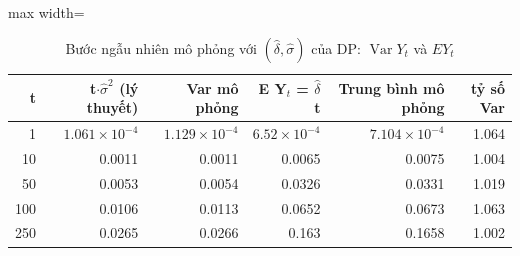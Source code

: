 \begin{table}[H]
\centering\small
\caption{Bước ngẫu nhiên mô phỏng với $(\hat\delta,\hat\sigma)$ của DP: $\operatorname{Var}Y_t$ và $EY_t$}\label{tab:tab_b12_02_rw_variance}
\begin{adjustbox}{max width=\linewidth}
\begin{tabular}{rrrrrr}
\toprule
t & t$\cdot\hat{\sigma}^{2}$ (lý thuyết) & Var mô phỏng & E Y$_{t}$ = $\hat{\delta}$t & Trung bình mô phỏng & tỷ số Var \\
\midrule
1 & $1.061\times10^{-4}$ & $1.129\times10^{-4}$ & $6.52\times10^{-4}$ & $7.104\times10^{-4}$ & 1.064 \\
10 & 0.0011 & 0.0011 & 0.0065 & 0.0075 & 1.004 \\
50 & 0.0053 & 0.0054 & 0.0326 & 0.0331 & 1.019 \\
100 & 0.0106 & 0.0113 & 0.0652 & 0.0673 & 1.063 \\
250 & 0.0265 & 0.0266 & 0.163 & 0.1658 & 1.002 \\
\bottomrule
\end{tabular}
\end{adjustbox}\par{}
\end{table}
